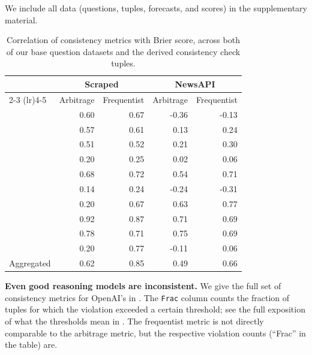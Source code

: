 We include all data (questions, tuples, forecasts, and scores) in the supplementary material.

\begin{table}[hbp]
    \centering
   \caption{Correlation of consistency metrics with Brier score, across both of our base question datasets and the derived consistency check tuples.}
   \label{tab:consistency-correlations}
   \small
   \begin{tabular}{lrrrr}
     \toprule
     & \multicolumn{2}{c}{Scraped} & \multicolumn{2}{c}{NewsAPI} \\
     \cmidrule(lr){2-3} \cmidrule(lr){4-5}
     & Arbitrage & Frequentist & Arbitrage & Frequentist \\
     \midrule
     \NegChecker{} & 0.60 & 0.67 & -0.36 & -0.13 \\
     \ParaphraseChecker{} & 0.57 & 0.61 & 0.13 & 0.24 \\
     \ConsequenceChecker{} & 0.51 & 0.52 & 0.21 & 0.30 \\
     \AndOrChecker{} & 0.20 & 0.25 & 0.02 & 0.06 \\
     \AndChecker{} & 0.68 & 0.72 & 0.54 & 0.71 \\
     \OrChecker{} & 0.14 & 0.24 & -0.24 & -0.31 \\
     \ButChecker{} & 0.20 & 0.67 & 0.63 & 0.77 \\
     \CondChecker{} & 0.92 & 0.87 & 0.71 & 0.69 \\
     \CondCondChecker{} & 0.78 & 0.71 & 0.75 & 0.69 \\
     \ExpectedEvidenceChecker{} & 0.20 & 0.77 & -0.11 & 0.06 \\
     Aggregated & 0.62 & 0.85 & 0.49 & 0.66 \\
     \bottomrule
   \end{tabular}
   \label{tab:consistency-correlations-2}
 \end{table}


\textbf{Even good reasoning models are inconsistent.}
We give the full set of consistency metrics for OpenAI's \oonemini{} in .
The \texttt{Frac} column counts the fraction of tuples for which the violation exceeded a certain threshold; see the full exposition of what the thresholds mean in .
The frequentist metric is not directly comparable to the arbitrage metric, but the respective violation counts (``Frac'' in the table) are.



